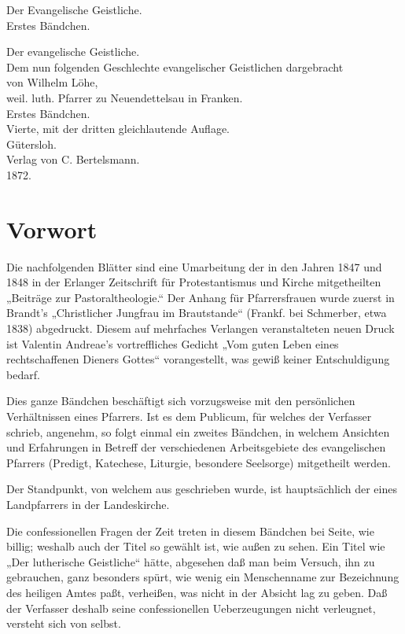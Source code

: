 \frontmatter
{}
\begin{titelseite}
{\Large Der Evangelische Geistliche.}\\[1.5em]
{\Large Erstes Bändchen.}
\end{titelseite}

\begin{titelseite}
{\LARGE Der evangelische Geistliche.}\\[1.5em]
Dem nun folgenden Geschlechte evangelischer Geistlichen dargebracht\\[1.5em]
von Wilhelm Löhe,\\
weil. luth. Pfarrer zu Neuendettelsau in Franken.\\[1.5em]
{\Large Erstes Bändchen.}\\[1.5em]
Vierte, mit der dritten gleichlautende Auflage.\\[1.5em]
Gütersloh.\\
Verlag von C. Bertelsmann.\\
1872.
\end{titelseite}

\chapter{Vorwort}

Die nachfolgenden Blätter sind eine Umarbeitung der in den Jahren 1847 und 1848 in der Erlanger Zeitschrift für Protestantismus und Kirche mitgetheilten „Beiträge zur Pastoraltheologie.“ Der Anhang für Pfarrersfrauen wurde zuerst in Brandt’s „Christlicher Jungfrau im Brautstande“ (Frankf. bei Schmerber, etwa 1838) abgedruckt. Diesem auf mehrfaches Verlangen veranstalteten neuen Druck ist Valentin Andreae’s vortreffliches Gedicht „Vom guten Leben eines rechtschaffenen Dieners Gottes“ vorangestellt, was gewiß keiner Entschuldigung bedarf.

Dies ganze Bändchen beschäftigt sich vorzugsweise mit den persönlichen Verhältnissen eines Pfarrers. Ist es dem Publicum, für welches der Verfasser schrieb, angenehm, so folgt einmal ein zweites Bändchen, in welchem Ansichten und Erfahrungen in Betreff der verschiedenen Arbeitsgebiete des
evangelischen Pfarrers (Predigt, Katechese, Liturgie, besondere Seelsorge) mitgetheilt werden.

Der Standpunkt, von welchem aus geschrieben wurde, ist hauptsächlich der eines Landpfarrers in der Landeskirche.

Die confessionellen Fragen der Zeit treten in diesem Bändchen bei Seite, wie billig; weshalb auch der Titel so gewählt ist, wie außen zu sehen. Ein Titel wie „Der lutherische Geistliche“ hätte, abgesehen daß man beim Versuch, ihn zu gebrauchen, ganz besonders spürt, wie wenig ein Menschenname zur Bezeichnung des heiligen Amtes paßt, verheißen, was nicht in der Absicht lag zu geben. Daß der Verfasser deshalb seine confessionellen Ueberzeugungen nicht verleugnet, versteht sich von selbst.

